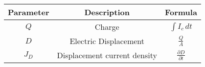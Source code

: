 \setlength{\arrayrulewidth}{0.3mm}
\setlength{\tabcolsep}{20pt}
\renewcommand{\arraystretch}{1.5}

\begin{tabular}{|c|c|c|}
\hline
Parameter & Description & Formula\\
\hline
$Q$ & Charge & $\int I_c\, dt$\\
\hline
$D$ & Electric Displacement & $\frac{Q}{A}$\\ 
\hline
$J_D$ & Displacement current density & $\frac{\partial D}{\partial t}$\\
\hline




\end{tabular}
